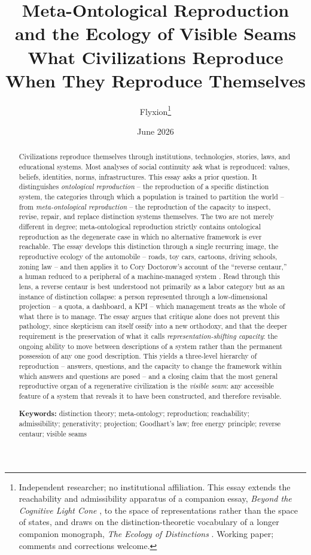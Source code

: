 \documentclass[11pt]{article}
\title{\Large\textbf{Meta-Ontological Reproduction and the Ecology of Visible Seams}\\[0.3em]
\large What Civilizations Reproduce When They Reproduce Themselves}
\author{Flyxion\thanks{Independent researcher; no institutional affiliation. This essay extends the reachability and admissibility apparatus of a companion essay, \emph{Beyond the Cognitive Light Cone} \cite{flyxion2026cone}, to the space of representations rather than the space of states, and draws on the distinction-theoretic vocabulary of a longer companion monograph, \emph{The Ecology of Distinctions} \cite{flyxion2026ecology}. Working paper; comments and corrections welcome.}}
\date{June 2026}
\theoremstyle{plain}
\begin{document}
\maketitle
\thispagestyle{plain}

\begin{abstract}
\noindent Civilizations reproduce themselves through institutions, technologies, stories, laws, and educational systems. Most analyses of social continuity ask what is reproduced: values, beliefs, identities, norms, infrastructures. This essay asks a prior question. It distinguishes \emph{ontological reproduction} -- the reproduction of a specific distinction system, the categories through which a population is trained to partition the world -- from \emph{meta-ontological reproduction} -- the reproduction of the capacity to inspect, revise, repair, and replace distinction systems themselves. The two are not merely different in degree; meta-ontological reproduction strictly contains ontological reproduction as the degenerate case in which no alternative framework is ever reachable. The essay develops this distinction through a single recurring image, the reproductive ecology of the automobile -- roads, toy cars, cartoons, driving schools, zoning law -- and then applies it to Cory Doctorow's account of the ``reverse centaur,'' a human reduced to a peripheral of a machine-managed system \cite{doctorow2026}. Read through this lens, a reverse centaur is best understood not primarily as a labor category but as an instance of distinction collapse: a person represented through a low-dimensional projection -- a quota, a dashboard, a KPI -- which management treats as the whole of what there is to manage. The essay argues that critique alone does not prevent this pathology, since skepticism can itself ossify into a new orthodoxy, and that the deeper requirement is the preservation of what it calls \emph{representation-shifting capacity}: the ongoing ability to move between descriptions of a system rather than the permanent possession of any one good description. This yields a three-level hierarchy of reproduction -- answers, questions, and the capacity to change the framework within which answers and questions are posed -- and a closing claim that the most general reproductive organ of a regenerative civilization is the \emph{visible seam}: any accessible feature of a system that reveals it to have been constructed, and therefore revisable.

\medskip
\noindent\textbf{Keywords:} distinction theory; meta-ontology; reproduction; reachability; admissibility; generativity; projection; Goodhart's law; free energy principle; reverse centaur; visible seams
\end{abstract}
\end{document}
